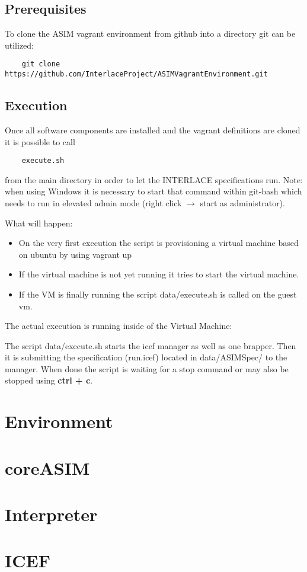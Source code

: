 \subsection{Prerequisites}

To clone the ASIM vagrant environment from github into a directory git can be utilized:

\begin{lstlisting}
	git clone https://github.com/InterlaceProject/ASIMVagrantEnvironment.git
\end{lstlisting}

\subsection{Execution}

Once all software components are installed and the vagrant definitions are cloned it is possible to call

\begin{lstlisting}
	execute.sh
\end{lstlisting}

from the main directory in order to let the INTERLACE specifications run. Note: when
using Windows it is necessary to start that command within git-bash which needs to run in
elevated admin mode (right click $\rightarrow$ start as administrator).

What will happen:
\begin{itemize}
	\item On the very first execution the script is provisioning a 
	virtual machine based on ubuntu by using vagrant up
	\item If the virtual machine is not yet running it tries to start
	the virtual machine.
	\item If the VM is finally running the script data/execute.sh is called on the guest vm.
\end{itemize}

The actual execution is running inside of the Virtual Machine:

The script data/execute.sh starts the icef manager as well as one brapper. Then it is submitting the specification (run.icef) located in data/ASIMSpec/ to the manager. When done the script is waiting for a stop command or may also be stopped using \textbf{ctrl + c}.

\section{Environment}

\section{coreASIM}

\section{Interpreter}

\section{ICEF}


